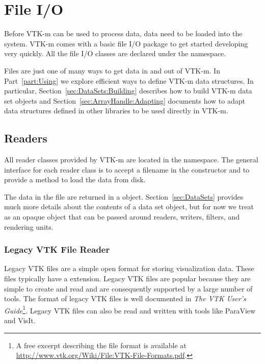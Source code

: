 \chapter{File I/O}
\label{chap:FileIO}


Before VTK-m can be used to process data, data need to be loaded into the
system. VTK-m comes with a basic file I/O package to get started developing
very quickly. All the file I/O classes are declared under the \vtkmio{}
namespace.

\begin{didyouknow}
  Files are just one of many ways to get data in and out of VTK-m. In
  Part~\ref{part:Using} we explore efficient ways to define VTK-m data
  structures. In particular, Section~\ref{sec:DataSets:Building} describes
  how to build VTK-m data set objects and
  Section~\ref{sec:ArrayHandle:Adapting} documents how to adapt data
  structures defined in other libraries to be used directly in VTK-m.
\end{didyouknow}

\section{Readers}


All reader classes provided by VTK-m are located in the \vtkmioreader{}
namespace. The general interface for each reader class is to accept a
filename in the constructor and to provide a  method
to load the data from disk.

The data in the file are returned in a  object.
Section~\ref{sec:DataSets} provides much more details about the contents of
a data set object, but for now we treat  as an
opaque object that can be passed around readers, writers, filters, and
rendering units.

\subsection{Legacy VTK File Reader}

Legacy VTK files are a simple open format for storing visualization data.
These files typically have a  extension. Legacy VTK
files are popular because they are simple to create and read and are
consequently supported by a large number of tools. The format of legacy VTK
files is well documented in \textit{The VTK User's Guide}\footnote{A free
  excerpt describing the file format is available at
  \url{http://www.vtk.org/Wiki/File:VTK-File-Formats.pdf}.}. Legacy VTK
files can also be read and written with tools like ParaView and VisIt.

